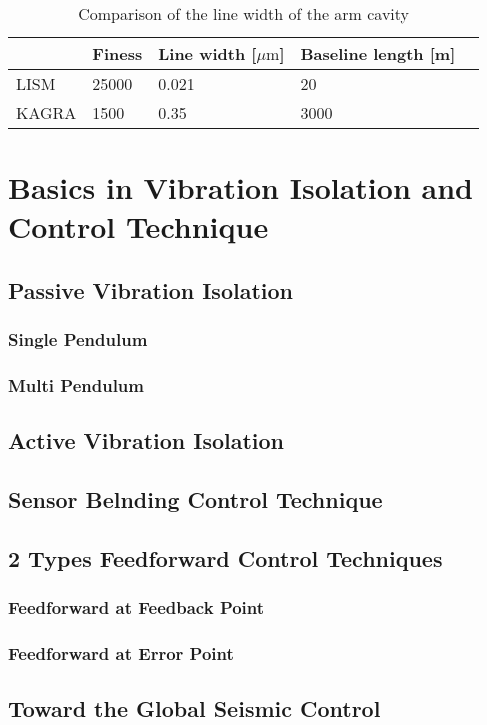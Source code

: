 \begin{table}[H]
  \centering
  \caption{Comparison of the line width of the arm cavity}
  \begin{tabular}{lllll}
    \hline
    & Finess   & Line width [$\mu\mathrm{m}$] & Baseline length [m]\\
    \hline
    LISM        & 25000  & 0.021 & 20\\
    KAGRA       & 1500   & 0.35  & 3000\\
    \hline
  \end{tabular}\label{tb:301}
\end{table}


\section{Basics in Vibration Isolation and Control Technique}
\subsection{Passive Vibration Isolation}
\subsubsection{Single Pendulum}
\subsubsection{Multi Pendulum}
\subsection{Active Vibration Isolation}
\subsection{Sensor Belnding Control Technique}
\subsection{2 Types Feedforward Control Techniques}
\subsubsection{Feedforward at Feedback Point} %
\subsubsection{Feedforward at Error Point} %

\subsection{Toward the Global Seismic Control}
